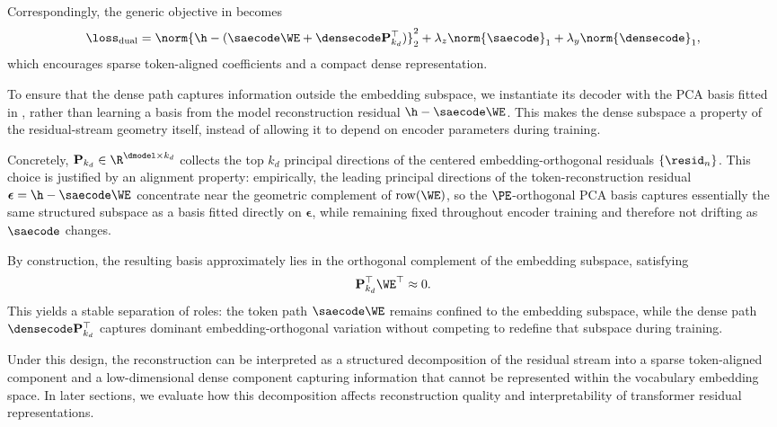 \documentclass{article}
\begin{document}
Correspondingly, the generic objective in  becomes
\begin{equation}
  \loss_{\text{dual}} =
  \norm{\h - (\saecode \WE + \densecode \mathbf{P}_{k_d}^\top)}_2^2
  + \lambda_z \norm{\saecode}_1
  + \lambda_y \norm{\densecode}_1 ,
\end{equation}
which encourages sparse token-aligned coefficients and a compact dense representation.

To ensure that the dense path captures information outside the embedding subspace, we instantiate its decoder with the PCA basis fitted in , rather than learning a basis from the model reconstruction residual $\h - \saecode \WE$. This makes the dense subspace a property of the residual-stream geometry itself, instead of allowing it to depend on encoder parameters during training.

Concretely, $\mathbf{P}_{k_d} \in \R^{\dmodel \times k_d}$ collects the top $k_d$ principal directions of the centered embedding-orthogonal residuals $\{\resid_n\}$.
This choice is justified by an alignment property: empirically, the leading principal directions of the token-reconstruction residual $\boldsymbol{\epsilon} = \h - \saecode\WE$ concentrate near the geometric complement of $\mathrm{row}(\WE)$, so the $\PE$-orthogonal PCA basis captures essentially the same structured subspace as a basis fitted directly on $\boldsymbol{\epsilon}$, while remaining fixed throughout encoder training and therefore not drifting as $\saecode$ changes.

By construction, the resulting basis approximately lies in the orthogonal complement of the embedding subspace, satisfying
\begin{equation}
  \mathbf{P}_{k_d}^\top \WE^\top \approx 0 .
\end{equation}
This yields a stable separation of roles: the token path $\saecode \WE$ remains confined to the embedding subspace, while the dense path $\densecode \mathbf{P}_{k_d}^\top$ captures dominant embedding-orthogonal variation without competing to redefine that subspace during training.

Under this design, the reconstruction can be interpreted as a structured decomposition of the residual stream into a sparse token-aligned component and a low-dimensional dense component capturing information that cannot be represented within the vocabulary embedding space. In later sections, we evaluate how this decomposition affects reconstruction quality and interpretability of transformer residual representations.
\end{document}
